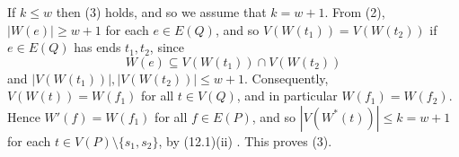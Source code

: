 If $k \le w$ then (3) holds, and so we assume that $k = w + 1$. From (2), $|W(e)| \ge w + 1$ for each $e \in E(Q)$, and so $V(W(t_1)) = V(W(t_2))$ if $e \in E(Q)$ has ends $t_1, t_2$, since
\begin{equation*}
W(e) \subseteq V(W(t_1)) \cap V(W(t_2))
\end{equation*}
and $|V(W(t_1))|, |V(W(t_2))| \le w + 1$. Consequently, $V(W(t)) = W(f_1)$ for all $t \in V(Q)$, and in particular $W(f_1) = W(f_2)$. Hence $W'(f) = W(f_1)$ for all $f \in E(P)$, and so $|V(W^*(t))| \le k = w + 1$ for each $t \in V(P) \setminus \{s_1, s_2\}$, by (12.1)(ii) . This proves (3).

